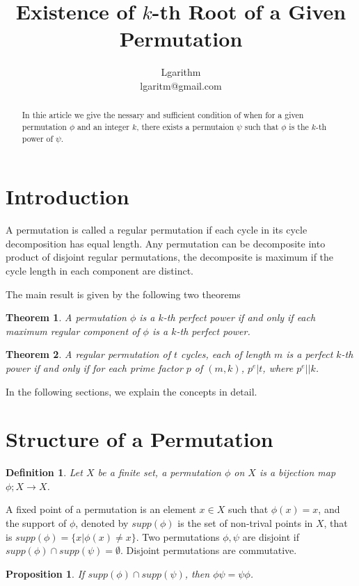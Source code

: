 \documentclass{article}
\title{Existence of $k$-th Root of a Given Permutation}
\author{Lgarithm\\\mbox{lgaritm@gmail.com}}
\newtheorem{defi}{Definition}
\newtheorem{prop}{Proposition}
\newtheorem{thm}{Theorem}
\def\supp{supp}
\begin{document}
\maketitle

\begin{abstract}
In thie article we give the nessary and sufficient condition of
when for a given permutation $\phi$ and an integer $k$, there exists
a permutaion $\psi$ such that $\phi$ is the $k$-th power of $\psi$.
\end{abstract}

\section{Introduction}
A permutation is called a regular permutation if each cycle
in its cycle decomposition has equal length.
Any permutation can be decomposite into product of disjoint
regular permutations, the decomposite is maximum if the cycle length
in each component are distinct.

The main result is given by the following two theorems
\begin{thm}
A permutation $\phi$ is a $k$-th perfect power if and only if
each maximum regular component of $\phi$ is a $k$-th perfect power.
\end{thm}

\begin{thm}
A regular permutation of $t$ cycles, each of length $m$ is a perfect $k$-th power
if and only if for each prime factor $p$ of $(m, k)$, $p^e \vert t$,
where $p^e \vert\vert k$.
\end{thm}

In the following sections, we explain the concepts in detail.

\section{Structure of a Permutation}
\begin{defi}
Let $X$ be a finite set, a permutation $\phi$ on $X$ is a
bijection map $\phi ; X \to X$.
\end{defi}

A fixed point of a permutation is an element $x \in X$ such that
$\phi(x) = x$, and the support of $\phi$, denoted by $\supp(\phi)$
is the set of non-trival points in $X$,
that is $\supp(\phi) = \{x \vert \phi(x) \neq x\}$.
Two permutations $\phi, \psi$ are disjoint if $\supp(\phi) \cap \supp(\psi) = \emptyset$.
Disjoint permutations are commutative.
\begin{prop}
If $\supp(\phi) \cap \supp(\psi)$, then $\phi \psi = \psi \phi$.
\end{prop}
\end{document}
